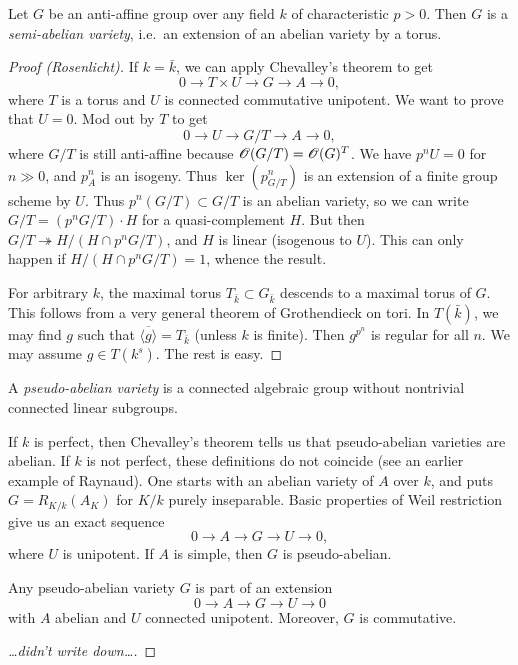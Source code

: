 \begin{prop}
Let $G$ be an anti-affine group over any field $k$ of characteristic $p>0$. 
Then $G$ is a \emph{semi-abelian variety}, i.e.\ an extension of an abelian 
variety by a torus. 
\end{prop}
\begin{proof}[Proof (Rosenlicht)]
If $k=\bar k$, we can apply Chevalley's theorem to get 
\[
  0 \to T\times U \to G \to A \to 0 ,
\]
where $T$ is a torus and $U$ is connected commutative unipotent. We want to 
prove that $U=0$. Mod out by $T$ to get 
\[
  0 \to U \to G/T \to A \to 0 ,
\]
where $G/T$ is still anti-affine because $\mathscr{O}(G/T)=\mathscr{O}(G)^T$. We have 
$p^n U=0$ for $n\gg 0$, and $p_A^n$ is an isogeny. Thus 
$\ker(p^n_{G/T})$ is an extension of a finite group scheme by $U$. Thus 
$p^n (G/T)\subset G/T$ is an abelian variety, so we can write 
$G/T=(p^n G/T)\cdot H$ for a quasi-complement $H$. But then 
$G/T\twoheadrightarrow H/(H\cap p^n G/T)$, and $H$ is linear (isogenous to 
$U$). This can only happen if $H/(H\cap p^n G/T)=1$, whence the result. 

For arbitrary $k$, the maximal torus $T_{\bar k}\subset G_{\bar k}$ descends to 
a maximal torus of $G$. This follows from a very general theorem of 
Grothendieck on tori. In $T(\bar k)$, we may find $g$ such that 
$\overline{\langle g\rangle} = T_{\bar k}$ (unless $k$ is finite). Then 
$g^{p^n}$ is regular for all $n$. We may assume $g\in T(k^s)$. The rest is 
easy. 
\end{proof}

\begin{defi}
A \emph{pseudo-abelian variety} is a connected algebraic group without 
nontrivial connected linear subgroups. 
\end{defi}


If $k$ is perfect, then Chevalley's theorem tells us that pseudo-abelian 
varieties are abelian. If $k$ is not perfect, these definitions do not 
coincide (see an earlier example of Raynaud). One starts with an abelian 
variety of $A$ over $k$, and puts $G=R_{K/k}(A_K)$ for $K/k$ purely 
inseparable. Basic properties of Weil restriction give us an exact sequence 
\[
  0 \to A \to G \to U \to 0 ,
\]
where $U$ is unipotent. If $A$ is simple, then $G$ is pseudo-abelian. 

\begin{theo}[Totaro]
Any pseudo-abelian variety $G$ is part of an extension 
\[
  0 \to A \to G \to U \to 0 
\]
with $A$ abelian and $U$ connected unipotent. Moreover, $G$ is commutative. 
\end{theo}
\begin{proof}
[\ldots didn't write down\ldots]
\end{proof}

